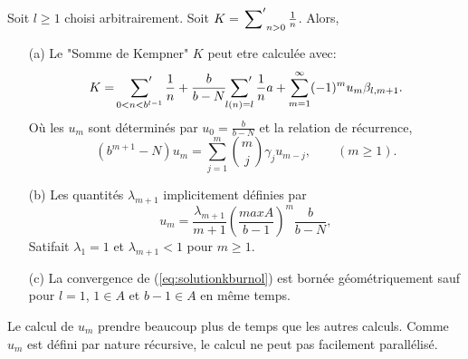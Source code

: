 \begin{thm}
	Soit $l\ge1$ choisi arbitrairement. Soit $K=\sideset{}{'}\sum_{n>0}\frac{1}{n}$. Alors,
	\begin{itemize}
		\item[(a)]
			Le "Somme de Kempner" $K$ peut etre calcul\'ee avec:
			\begin{equation}
				K = \sideset{}{'}\sum_{0<n<b^{l-1}}\frac{1}{n} + \frac{b}{b-N}\sideset{}{'}\sum_{l(n)=l}\frac{1}{n}a + \sum_{m=1}^{\infty}(-1)^{m}u_{m}\beta_{l, m+1}.
				\label{eq:solutionkburnol}
			\end{equation}
			O\`u les $u_{m}$ sont d\'etermin\'es par $u_{0} = \frac{b}{b-N}$ et
			la relation de récurrence,
			\begin{equation}
				(b^{m+1}-N)u_{m} = \sum_{j=1}^{m}\binom{m}{j}\gamma_{j}u_{m-j}, \qquad (m\ge1).
				\label{eq:umburnol}
			\end{equation}

		\item[(b)] Les quantit\'es $\lambda_{m+1}$ implicitement d\'efinies par
			\begin{equation}
				u_{m} = \frac{\lambda_{m+1}}{m+1}\left( \frac{max A}{b-1} \right)^{m}\frac{b}{b-N},
				\label{eq:lambdaburnol}
			\end{equation}
			Satifait $\lambda_{1} = 1$ et $\lambda_{m+1} < 1$ pour $m \ge 1$.
		\item[(c)] La convergence de (\ref{eq:solutionkburnol}) est born\'ee
			g\'eom\'etriquement sauf pour $l=1$, $1\in A$ et $b-1 \in A$ en
			m\^eme temps.
	\end{itemize}
	\label{thm:resultburnol}
\end{thm}
Le calcul de $u_{m}$ prendre beaucoup plus de temps que les autres calculs.
Comme $u_{m}$ est d\'efini par nature r\'ecursive, le calcul ne peut pas
facilement parall\'elis\'e.

